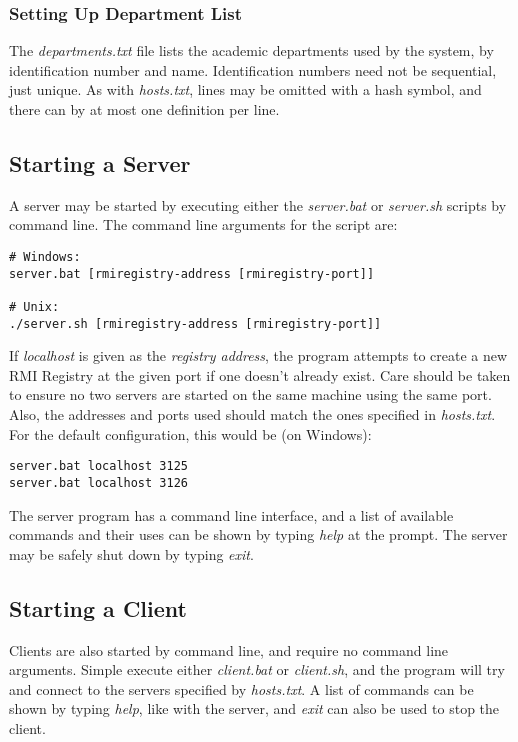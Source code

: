 \documentclass[a4paper,11pt]{article}
\begin{document}
\subsubsection{Setting Up Department List}
The \emph{departments.txt} file lists the academic departments used by the system, by identification number and name. Identification numbers need not be sequential, just unique. As with \emph{hosts.txt}, lines may be omitted with a hash symbol, and there can by at most one definition per line.

\subsection{Starting a Server}
A server may be started by executing either the \emph{server.bat} or \emph{server.sh} scripts by command line. The command line arguments for the script are:

\begin{verbatim}
# Windows:
server.bat [rmiregistry-address [rmiregistry-port]]

# Unix:
./server.sh [rmiregistry-address [rmiregistry-port]]
\end{verbatim}

\noindent
If \emph{localhost} is given as the \emph{registry address}, the program attempts to create a new RMI Registry at the given port if one doesn't already exist. Care should be taken to ensure no two servers are started on the same machine using the same port. Also, the addresses and ports used should match the ones specified in \emph{hosts.txt}. For the default configuration, this would be (on Windows):

\begin{verbatim}
server.bat localhost 3125
server.bat localhost 3126
\end{verbatim}

\noindent
The server program has a command line interface, and a list of available commands and their uses can be shown by typing \emph{help} at the prompt. The server may be safely shut down by typing \emph{exit}.

\subsection{Starting a Client}
Clients are also started by command line, and require no command line arguments. Simple execute either \emph{client.bat} or \emph{client.sh}, and the program will try and connect to the servers specified by \emph{hosts.txt}. A list of commands can be shown by typing \emph{help}, like with the server, and \emph{exit} can also be used to stop the client.
\end{document}
